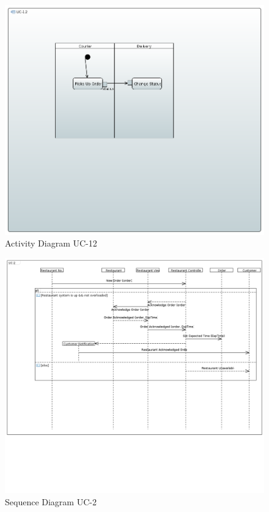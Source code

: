 \begin{figure}[h!]
\begin{center}
\includegraphics[scale=0.5]{FIGS/UC-12.PNG}
    \caption{Activity Diagram UC-12}
    \label{fig:act_diag12}
\end{center}
\end{figure}

\begin{figure}[h!]
\begin{center}
\includegraphics[scale=0.35]{FIGS/UC-21.PNG}
    \caption{Sequence Diagram UC-2}
    \label{fig:seq_diag2}
\end{center}
\end{figure}

